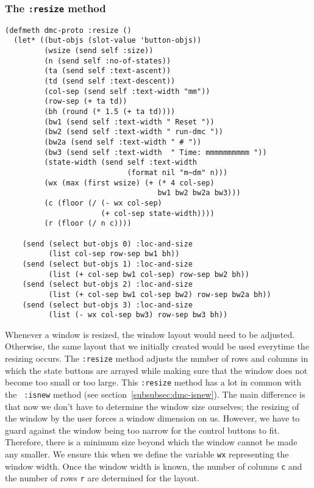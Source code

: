 \subsubsection{The {\tt :resize} method}
\label{subsubsec:resize}
\begin{verbatim}
(defmeth dmc-proto :resize ()
  (let* ((but-objs (slot-value 'button-objs))
         (wsize (send self :size))
         (n (send self :no-of-states))
         (ta (send self :text-ascent))
         (td (send self :text-descent))
         (col-sep (send self :text-width "mm"))
         (row-sep (+ ta td))
         (bh (round (* 1.5 (+ ta td))))
         (bw1 (send self :text-width " Reset "))
         (bw2 (send self :text-width " run-dmc "))
         (bw2a (send self :text-width " # "))
         (bw3 (send self :text-width  " Time: mmmmmmmmmm "))
         (state-width (send self :text-width 
                            (format nil "m~dm" n)))
         (wx (max (first wsize) (+ (* 4 col-sep) 
                                   bw1 bw2 bw2a bw3)))
         (c (floor (/ (- wx col-sep) 
                      (+ col-sep state-width))))
         (r (floor (/ n c))))

    (send (select but-objs 0) :loc-and-size 
          (list col-sep row-sep bw1 bh))
    (send (select but-objs 1) :loc-and-size 
          (list (+ col-sep bw1 col-sep) row-sep bw2 bh))
    (send (select but-objs 2) :loc-and-size
          (list (+ col-sep bw1 col-sep bw2) row-sep bw2a bh))
    (send (select but-objs 3) :loc-and-size
          (list (- wx col-sep bw3) row-sep bw3 bh))
\end{verbatim}
Whenever a window is resized, the window layout would need to be
adjusted.  Otherwise, the same layout that we initially created would be
used everytime the resizing occurs.  The {\tt :resize} method adjusts
the number of rows and columns in which the state buttons are arrayed
while making sure that the window does not become too small or too
large. This {\tt :resize} method has a lot in common with the {\tt
  :isnew} method (see section~\ref{subsubsec:dmc-isnew}).  The main
difference is that now we don't have to determine the window size
ourselves;  the resizing of the window by the user forces a window
dimension on us. However, we have to guard against the window being
too narrow for the control buttons to fit. Therefore, there is a
minimum size beyond which the window cannot be made any smaller.  We
ensure this when we define the variable {\tt wx} representing the
window width. Once the window width is known, the number of columns
{\tt c} and the number of rows {\tt r} are determined for the layout.

